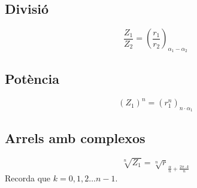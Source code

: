 \documentclass[12pt,a4paper]{article}
\begin{document}
\subsection{Divisió}
$$\frac{Z_1}{Z_2}=\left(\frac{r_1}{r_2}\right)_{\alpha_1-\alpha_2}$$
\subsection{Potència}
$$\left(Z_1\right)^n=\left(r_1^n\right)_{n\cdot\alpha_1}$$
\subsection{Arrels amb complexos}
$$\sqrt[n]{Z_1}=\sqrt[n]{r}_{\frac{\alpha}{n}+\frac{2\pi\cdot k}{n}}$$
Recorda que $k = 0,1,2\dots n-1$.
\end{document}
